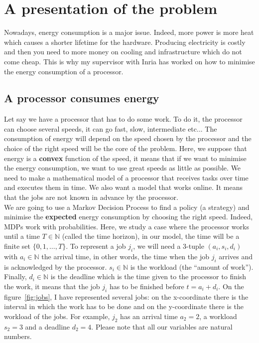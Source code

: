 \documentclass[
10pt, %
a4paper, %
oneside, %
headinclude,footinclude, %
BCOR5mm, %
]{scrartcl}
\newcommand{\N}{\mathbb{N}}
\begin{document}
\section{A presentation of the problem}
Nowadays, energy consumption is a major issue. Indeed, more power is
more heat which causes a shorter lifetime for the hardware.
Producing electricity is costly and then you need to more money on
cooling and infrastructure which do not come cheap. This is
why my supervisor with Inria has worked on how to minimise the
energy consumption of a processor.

\subsection{A processor consumes energy}
Let say we have a processor that has to do some work. To do it,
the processor can choose several speeds, it can go fast, slow,
intermediate etc... The consumption of energy will depend on the speed
chosen by the processor and the choice of the right speed will be the
core of the problem.
Here, we suppose that energy is a \textbf{convex} function of
the speed, it means that if we want to minimise the energy
consumption, we want to use great speeds as little as possible. We
need to make a mathematical model of a processor that receives tasks
over time and executes them in time. We also want a model that works
online. It means that the jobs are not known in advance by the
processor.\\

We are going to use a Markov Decision Process to
find a policy (a strategy) and
minimise the \textbf{expected} energy consumption by choosing the right
speed. Indeed, MDPs work with probabilities.
Here, we study a case where the processor works until a time
$T\in\N$ (called the time horizon), in our model, the time will be a
finite set
$\{0,1,\dots,T\}$. To represent a job $j_i$, we will need a 3-tuple
$(a_i,s_i,d_i)$ with $a_i\in\N$ the arrival time, in other words, the
time when the job $j_i$ arrives and is acknowledged by the processor. $s_i\in\N$ is the
workload (the ``amount of work''). Finally, $d_i\in\N$ is the deadline
which is the time given to the processor to finish the work,
it means that the job $j_i$ has to be finished before $t=a_i+d_i$. On the
figure~\ref{fig:jobs}, I have represented several jobs: on the x-coordinate
there is the interval in which the work has to be done and on the
y-coordinate there is the workload of the jobs. For example, $j_2$ has an
arrival time $a_2=2$, a workload $s_2=3$ and a deadline
$d_2=4$. Please note that all our variables are natural numbers.\\
\end{document}
